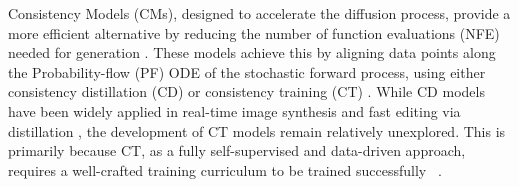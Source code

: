 Consistency Models (CMs), designed to accelerate the diffusion process, provide a more efficient alternative by reducing the number of function evaluations (NFE) needed for generation \cite{song2023consistency,kim2023consistency,kim2024generalized,li2024bidirectional,heek2024multistep,lu2024simplifyingstabilizingscalingcontinuoustime,lee2025truncatedconsistencymodels}. These models achieve this by aligning data points along the Probability-flow (PF) ODE of the stochastic forward process, using either consistency distillation (CD) or consistency training (CT) \cite{song2023consistency}. While CD models have been widely applied in real-time image synthesis and fast editing via distillation \cite{luo2023latent,starodubcev2024invertible}, the development of CT models remain relatively unexplored. This is primarily because CT, as a fully self-supervised and data-driven approach, requires a well-crafted training curriculum to be trained successfully ~\cite{song2023improved,ect}.

